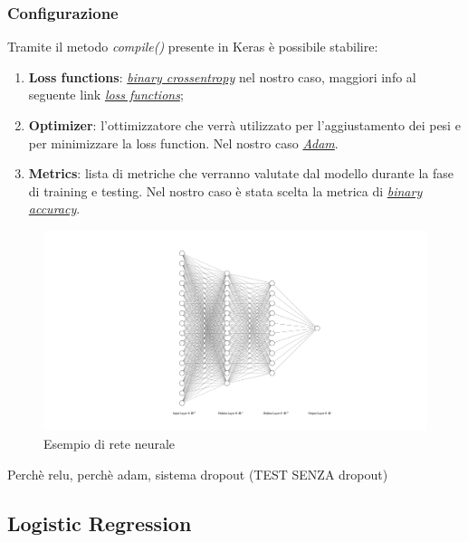 \subsubsection{Configurazione}
Tramite il metodo \textit{compile()} presente in Keras è possibile stabilire:
\begin{enumerate}
	\item \textbf{Loss functions}: \href{https://en.wikipedia.org/wiki/Cross_entropy}{\textit{binary crossentropy}} nel nostro caso, maggiori info al seguente link \href{https://keras.io/losses/}{\textit{loss functions}};
	\item \textbf{Optimizer}: l'ottimizzatore che verrà utilizzato per l'aggiustamento dei pesi e per minimizzare la loss function.
	Nel nostro caso \href{https://arxiv.org/pdf/1412.6980v8.pdf}{\textit{Adam}}. 
	\item \textbf{Metrics}: lista di metriche che verranno valutate dal modello durante la fase di training e testing.
	Nel nostro caso è stata scelta la metrica di \href{https://keras.io/metrics/#binary_accuracy}{\textit{binary accuracy}}.  
\end{enumerate} 

\begin{figure}[H]
	\includegraphics[scale=0.5,center]{img/nnExample.png}
	\caption{Esempio di rete neurale}
\end{figure}

Perchè relu, perchè adam, sistema dropout
(TEST SENZA dropout)
\subsection{Logistic Regression}


